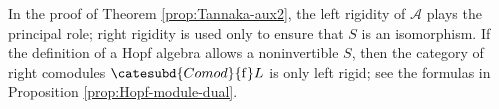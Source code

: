In the proof of Theorem \ref{prop:Tannaka-aux2}, the left rigidity of
$\mathcal{A}$ plays the principal role; right rigidity is used only to
ensure that $S$ is an isomorphism. If the definition of a Hopf algebra
allows a noninvertible $S$, then the category of right comodules
$\catesubd{Comod}{\mathrm{f}}L$ is only left rigid; see the formulas in
Proposition \ref{prop:Hopf-module-dual}.

